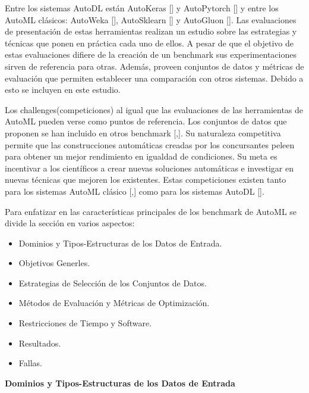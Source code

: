 Entre los sistemas AutoDL están AutoKeras [\cite{13}] y AutoPytorch [\cite{21}] y entre los AutoML clásicos: AutoWeka [\cite{8}], AutoSklearn [\cite{9}] y 
AutoGluon  [\cite{17}]. Las evaluaciones de presentación de estas herramientas realizan un estudio sobre las estrategias y técnicas que ponen en práctica cada uno 
de ellos. A pesar de que el objetivo de estas evaluaciones difiere de la creación de un benchmark sus experimentaciones sirven de referencia para otras. Además, 
proveen conjuntos de datos y métricas de evaluación que permiten establecer una comparación con otros sistemas. Debido a esto se incluyen en este estudio.

Los challenges(competiciones) al igual que las evaluaciones de las herramientas de AutoML pueden verse como puntos de referencia. Los conjuntos de datos que 
proponen se han incluido en otros benchmark [\cite{14},\cite{15}]. Su naturaleza competitiva permite que las construcciones 
automáticas creadas por los concursantes peleen para obtener un mejor rendimiento en igualdad de condiciones. Su meta es incentivar a los científicos a crear nuevas 
soluciones automáticas e investigar en nuevas técnicas que mejoren los existentes. Estas competiciones existen tanto para los sistemas AutoML clásico 
[\cite{11},\cite{12}] como para los sistemas AutoDL [\cite{29}].

Para enfatizar en las características principales de los benchmark de AutoML se divide la sección en varios aspectos:

\begin{itemize}
    \item Dominios y Tipos-Estructuras de los Datos de Entrada.
    \item Objetivos Generles.
    \item Estrategias de Selección de los Conjuntos de Datos.
    \item Métodos de Evaluación y Métricas de Optimización. 
    \item Restricciones de Tiempo y  Software.
    \item Resultados.
    \item Fallas. 
    \end{itemize} 

\begin{flushleft} 
    {\large { \textbf{Dominios y Tipos-Estructuras de los Datos de Entrada}}}\label{subsection:dom_AutoML}
\end{flushleft}

